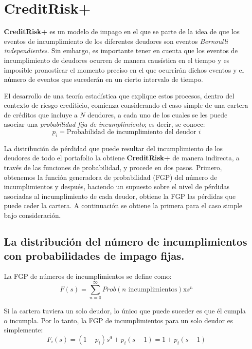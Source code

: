 \documentclass[
  12pt,
]{krantz}
\theoremstyle{definition}
\theoremstyle{definition}
\theoremstyle{definition}
\theoremstyle{remark}
\begin{document}
\mainmatter

\hypertarget{creditrisk}{%
\chapter{CreditRisk+}\label{creditrisk}}

\textbf{CreditRisk+} es un modelo de impago en el que se parte de la idea de que los eventos de incumplimiento de los diferentes deudores son eventos \emph{Bernoulli independientes}. Sin embargo, es importante tener en cuenta que los eventos de incumplimiento de deudores ocurren de manera causística en el tiempo y es imposible pronosticar el momento preciso en el que ocurrirán dichos eventos y el número de eventos que sucederán en un cierto intervalo de tiempo.

El desarrollo de una teoría estadística que explique estos procesos, dentro del contexto de riesgo crediticio, comienza considerando el caso simple de una cartera de créditos que incluye a \(N\) deudores, a cada uno de los cuales se les puede asociar una \emph{probabilidad fija de incumplimiento}; es decir, se conoce: \[p_i=\textrm{Probabilidad de incumplimiento del deudor } i\]

La distribución de pérdidad que puede resultar del incumplimiento de los deudores de todo el portafolio la obtiene \textbf{CreditRisk+} de manera indirecta, a través de las funciones de probabilidad, y procede en dos pasos. Primero, obtenemos la función generadora de probabilidad (FGP) del número de incumplimientos y después, haciendo un supuesto sobre el nivel de pérdidas asociadas al incumplimiento de cada deudor, obtiene la FGP las pérdidas que puede ceder la cartera. A continuación se obtiene la primera para el caso simple bajo consideración.

\hypertarget{la-distribucion-del-numero-de-incumplimientos-con-probabilidades-de-impago-fijas.}{%
\section{La distribución del número de incumplimientos con probabilidades de impago fijas.}\label{la-distribucion-del-numero-de-incumplimientos-con-probabilidades-de-impago-fijas.}}

La FGP de números de incumplimientos se define como: \[F(s)=\sum_{n=0}^{\infty}Prob(n \textrm{ incumplimientos})\textrm{x}s^n\]

Si la cartera tuviera un solo deudor, lo único que puede suceder es que él cumpla o incumpla. Por lo tanto, la FGP de incumplimientos para un solo deudor es simplemente:\[F_i(s)=(1-p_i)s^0+p_i(s-1)=1+p_i(s-1)\]
\end{document}
